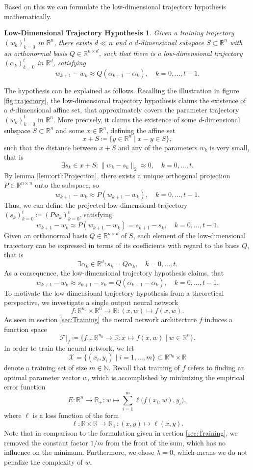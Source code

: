 \documentclass[11pt, a4paper]{article}
\newtheorem*{hypothesis}{Low-Dimensional Trajectory Hypothesis}
\newcommand{\N}{\mathbb{N}}
\newcommand{\R}{\mathbb{R}}
\newcommand{\F}{\mathcal{F}}
\newcommand{\X}{\mathcal{X}}
\begin{document}
Based on this we can formulate the low-dimensional trajectory hypothesis mathematically.

\begin{hypothesis}
Given a training trajectory $(w_k)_{k=0}^{t}$ in $\R^n$, there exists $d \ll n$ and a $d$-dimensional subspace $S \subset \R^n$ with an orthonormal basis $Q \in \R^{n \times d}$, such that there is a low-dimensional trajectory $(\alpha_k)_{k=0}^{t}$ in $\R^d$, satisfying 
\[ w_{k+1} - w_k \approx Q(\alpha_{k+1} - \alpha_k), \quad k=0, \dots, t-1. \]
\end{hypothesis}
The hypothesis can be explained as follows. Recalling the illustration in figure \ref{fig:trajectory}, the low-dimensional trajectory hypothesis claims the existence of a $d$-dimensional affine set, that approximately covers the parameter trajectory $(w_k)_{k=0}^{t}$ in $\R^n$. More precisely, it claims the existence of some $d$-dimensional subspace $S \subset \R^n$ and some $x \in \R^n$, defining the affine set
\[ x + S \coloneq \big \{ y \in \R^n \mid x - y \in S \big \}, \]
such that the distance between $x + S$ and any of the parameters $w_k$ is very small, that is
\[ \exists s_k \in x + S : \big \| w_k - s_k \big \|_2 \approx 0, \quad k=0, \dots, t. \]
By lemma \ref{lem:orthProjection}, there exists a unique orthogonal projection $P \in \R^{n \times n}$ onto the subspace, so
\[ w_{k+1} - w_k \approx P(w_{k+1} - w_k), \quad k=0, \dots, t-1. \]
Thus, we can define the projected low-dimensional trajectory $(s_k)_{k=0}^{t} \coloneq (Pw_k)_{k=0}^{t}$, satisfying
\[ w_{k+1} - w_k \approx P(w_{k+1} - w_k) = s_{k+1} - s_k, \quad k=0, \dots, t-1. \]
Given an orthonormal basis $Q \in \R^{n \times d}$ of $S$, each element of the low-dimensional trajectory can be expressed in terms of its coefficients with regard to the basis $Q$, that is
\[ \exists \alpha_k \in \R^{d}: s_k = Q\alpha_k, \quad k=0, \dots, t. \]
As a consequence, the low-dimensional trajectory hypothesis claims, that
\[ w_{k+1} - w_k \approx s_{k+1} - s_k = Q(\alpha_{k+1} - \alpha_k), \quad k=0, \dots, t-1. \]
To motivate the low-dimensional trajectory hypothesis from a theoretical perspective, we investigate a single output neural network
\[ f: \R^{n_0} \times \R^n \to \R : (x,w) \mapsto f(x,w). \]
As seen in section \ref{sec:Training} the neural network architecture $f$ induces a function space
\[ \F |_{f} \coloneq \Big \{ f_w : \R^{n_0} \to \R : x \mapsto f(x,w) \mid w \in \R^n \Big \}. \]
In order to train the neural network, we let
\[ \X = \big \{ (x_i,y_i) \mid i=1, \dots, m \big \} \subset \R^{n_0} \times \R \] 
denote a training set of size $m \in \N$. Recall that training of $f$ refers to finding an optimal parameter vector $w$, which is accomplished by minimizing the empirical error function
\[ E : \R^n \to \R_+ : w \mapsto \sum_{i=1}^{m} \ell \big (f(x_i,w), y_i \big ), \]
where $\ell$ is a loss function of the form
\[ \ell: \R \times \R \to \R_+ : (x,y) \mapsto \ell(x,y). \]
Note that in comparison to the formulation given in section \ref{sec:Training}, we removed the constant factor $1/m$ from the front of the sum, which has no influence on the minimum. Furthermore, we chose $\lambda = 0$, which means we do not penalize the complexity of $w$. \\
\end{document}
